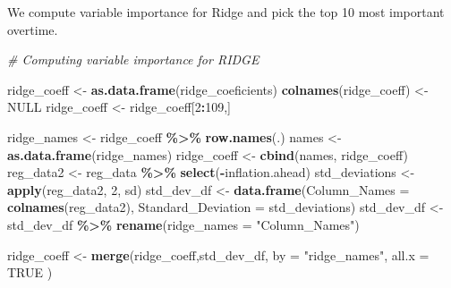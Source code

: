 \documentclass[
]{article}
\newenvironment{Shaded}{\begin{snugshade}}{\end{snugshade}}
\newcommand{\AttributeTok}[1]{\textcolor[rgb]{0.13,0.29,0.53}{#1}}
\newcommand{\CommentTok}[1]{\textcolor[rgb]{0.56,0.35,0.01}{\textit{#1}}}
\newcommand{\ConstantTok}[1]{\textcolor[rgb]{0.56,0.35,0.01}{#1}}
\newcommand{\DecValTok}[1]{\textcolor[rgb]{0.00,0.00,0.81}{#1}}
\newcommand{\FunctionTok}[1]{\textcolor[rgb]{0.13,0.29,0.53}{\textbf{#1}}}
\newcommand{\NormalTok}[1]{#1}
\newcommand{\OtherTok}[1]{\textcolor[rgb]{0.56,0.35,0.01}{#1}}
\newcommand{\SpecialCharTok}[1]{\textcolor[rgb]{0.81,0.36,0.00}{\textbf{#1}}}
\newcommand{\StringTok}[1]{\textcolor[rgb]{0.31,0.60,0.02}{#1}}
\begin{document}
We compute variable importance for Ridge and pick the top 10 most
important overtime.

\begin{Shaded}
\begin{Highlighting}[]
\CommentTok{\# Computing variable importance for RIDGE}

\NormalTok{ridge\_coeff }\OtherTok{\textless{}{-}} \FunctionTok{as.data.frame}\NormalTok{(ridge\_coeficients)}
\FunctionTok{colnames}\NormalTok{(ridge\_coeff) }\OtherTok{\textless{}{-}} \ConstantTok{NULL}
\NormalTok{ridge\_coeff }\OtherTok{\textless{}{-}}\NormalTok{ ridge\_coeff[}\DecValTok{2}\SpecialCharTok{:}\DecValTok{109}\NormalTok{,]  }

\NormalTok{ridge\_names }\OtherTok{\textless{}{-}}\NormalTok{ ridge\_coeff }\SpecialCharTok{\%\textgreater{}\%} \FunctionTok{row.names}\NormalTok{(.)}
\NormalTok{names }\OtherTok{\textless{}{-}} \FunctionTok{as.data.frame}\NormalTok{(ridge\_names)}
\NormalTok{ridge\_coeff }\OtherTok{\textless{}{-}} \FunctionTok{cbind}\NormalTok{(names, ridge\_coeff)}
\NormalTok{reg\_data2 }\OtherTok{\textless{}{-}}\NormalTok{ reg\_data }\SpecialCharTok{\%\textgreater{}\%} \FunctionTok{select}\NormalTok{(}\SpecialCharTok{{-}}\NormalTok{inflation.ahead) }
\NormalTok{std\_deviations }\OtherTok{\textless{}{-}} \FunctionTok{apply}\NormalTok{(reg\_data2, }\DecValTok{2}\NormalTok{, sd)}
\NormalTok{std\_dev\_df }\OtherTok{\textless{}{-}} \FunctionTok{data.frame}\NormalTok{(}\AttributeTok{Column\_Names =} \FunctionTok{colnames}\NormalTok{(reg\_data2), }\AttributeTok{Standard\_Deviation =}\NormalTok{ std\_deviations)}
\NormalTok{std\_dev\_df }\OtherTok{\textless{}{-}}\NormalTok{ std\_dev\_df }\SpecialCharTok{\%\textgreater{}\%} \FunctionTok{rename}\NormalTok{(}\AttributeTok{ridge\_names =} \StringTok{"Column\_Names"}\NormalTok{)}

\NormalTok{ridge\_coeff }\OtherTok{\textless{}{-}} \FunctionTok{merge}\NormalTok{(ridge\_coeff,std\_dev\_df, }\AttributeTok{by =} \StringTok{"ridge\_names"}\NormalTok{, }\AttributeTok{all.x =} \ConstantTok{TRUE}\NormalTok{ )}


\end{Highlighting}
\end{Shaded}
\end{document}
